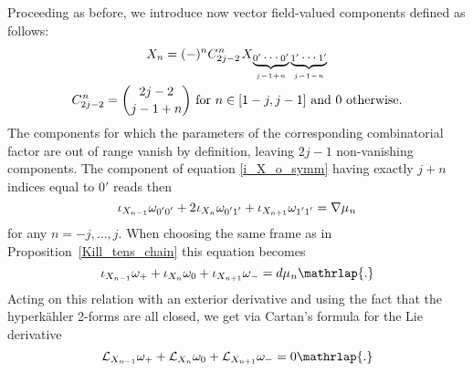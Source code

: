 \documentclass[11pt]{amsart}
\theoremstyle{remark}
\theoremstyle{remark}
\theoremstyle{definition}
\theoremstyle{definition}
\theoremstyle{definition}
\newcommand{\0}{{\scriptstyle 0'}} %
\newcommand{\1}{{\scriptstyle 1'}}
\newcommand{\pt}{\hspace{1pt}} %
\newcommand{\hp}{\hspace{0.5pt}} %
\begin{document}
Proceeding as before, we introduce now vector field-valued components defined as follows:
{\allowdisplaybreaks
\begin{gather}
X_{n} = (-)^n C^{\hp n}_{2j-2} \pt X_{\hp\underbrace{\0 \cdots \0}_\text{$j\!-\!1\!+\!n$}\underbrace{\1 \cdots \1}_\text{$j\!-\!1\!-\!n$}} \\
C^{\hp n}_{2j-2} = \dbinom{2j-2}{j-1+n} \text{ for $n \in [1-j,j-1]$ and $0$ otherwise.} \nonumber
\end{gather}
}%
The components for which the parameters of the corresponding combinatorial factor are out of range vanish by definition, leaving $2j-1$ non-vanishing components. The component of equation \eqref{i_X_o_symm} having exactly $j+n$ indices equal to $0'$ reads then
\begin{equation} 
\iota_{X_{n-1}} \omega_{\0\0} + 2\hp \iota_{X_{n}} \omega_{\0\1} + \iota_{X_{n+1}} \omega_{\1\1} = \nabla \mu_{\hp n}
\end{equation}
for any $n = -j, \dots, j$. When choosing the same frame as in Proposition~\ref{Kill_tens_chain} this equation becomes
\begin{equation} \label{i_X_M}
\iota_{X_{n-1}} \omega_+ + \iota_{X_{n}} \omega_0 + \iota_{X_{n+1}} \omega_- = d\mu_{\hp n} \mathrlap{.}
\end{equation}
Acting on this relation with an exterior derivative and using the fact that the hyperk\"ahler 2-forms are all closed, we get via Cartan's formula for the Lie derivative
\begin{equation} \label{L_X_M}
\mathcal{L}_{X_{n-1}} \omega_+ + \mathcal{L}_{X_{n}} \omega_0 + \mathcal{L}_{X_{n+1}} \omega_- = 0 \mathrlap{.}
\end{equation}
\end{document}
